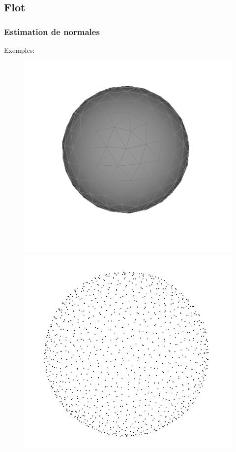 \documentclass{beamer}
\begin{document}
\subsection{Flot}
\begin{frame}
    \frametitle{Estimation de normales}

    Exemples:
    \begin{figure}
        \centering
        \includegraphics[scale=0.22]{img/sphere-polyhedron-200}
        \includegraphics[scale=0.2]{img/sphere-1000}

\end{figure}
\end{frame}
\end{document}
